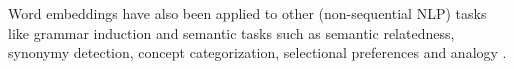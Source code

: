 Word embeddings have also been applied to other (non-sequential NLP) tasks like grammar induction \cite{Spitkovsky:2011} and semantic tasks such as semantic relatedness, synonymy detection, concept categorization, selectional preferences and analogy \cite{baroni:2014}.

\nss{[Guo et al. 2014?]}





